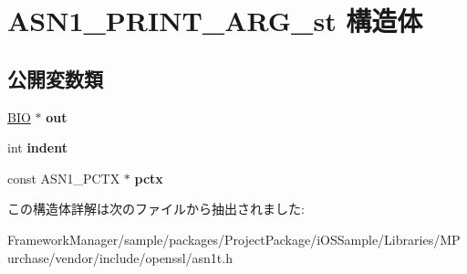 \hypertarget{struct_a_s_n1___p_r_i_n_t___a_r_g__st}{}\section{A\+S\+N1\+\_\+\+P\+R\+I\+N\+T\+\_\+\+A\+R\+G\+\_\+st 構造体}
\label{struct_a_s_n1___p_r_i_n_t___a_r_g__st}
\subsection*{公開変数類}
\begin{DoxyCompactItemize}
\item 
\hypertarget{struct_a_s_n1___p_r_i_n_t___a_r_g__st_a238eca48eea38372c40de60fbdc4d4ee}{}\hyperlink{structbio__st}{B\+I\+O} $\ast$ {\bfseries out}\label{struct_a_s_n1___p_r_i_n_t___a_r_g__st_a238eca48eea38372c40de60fbdc4d4ee}

\item 
\hypertarget{struct_a_s_n1___p_r_i_n_t___a_r_g__st_a62f3360ea4704ea92e62e0a4c28d238f}{}int {\bfseries indent}\label{struct_a_s_n1___p_r_i_n_t___a_r_g__st_a62f3360ea4704ea92e62e0a4c28d238f}

\item 
\hypertarget{struct_a_s_n1___p_r_i_n_t___a_r_g__st_a6ef7daafd5db8eeb310b27206b3b243a}{}const A\+S\+N1\+\_\+\+P\+C\+T\+X $\ast$ {\bfseries pctx}\label{struct_a_s_n1___p_r_i_n_t___a_r_g__st_a6ef7daafd5db8eeb310b27206b3b243a}

\end{DoxyCompactItemize}


この構造体詳解は次のファイルから抽出されました\+:\begin{DoxyCompactItemize}
\item 
Framework\+Manager/sample/packages/\+Project\+Package/i\+O\+S\+Sample/\+Libraries/\+M\+Purchase/vendor/include/openssl/asn1t.\+h\end{DoxyCompactItemize}

